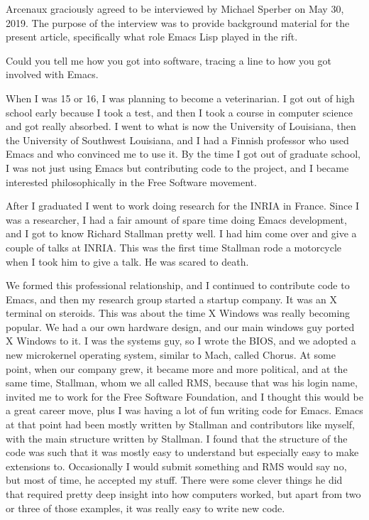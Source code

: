 \documentclass[format=acmsmall,screen]{acmart}
\begin{document}
Arcenaux graciously agreed to be interviewed by Michael Sperber on May 30,
2019.  The purpose of the interview was to provide background material for
the present article, specifically what role Emacs Lisp played in the rift.
%
\begin{question}
Could you tell me how you got into software, tracing a line to how
you got involved with Emacs.
\end{question}
%
When I was 15 or 16, I was planning to become a veterinarian.  I
got out of high school early because I took a test, and then I took a
course in computer science and got really absorbed.  I went to what is
now the University of Louisiana, then the University of Southwest
Louisiana, and I had a Finnish professor who used Emacs and who
convinced me to use it.  By the time I got out of graduate school, I
was not just using Emacs but contributing code to the project, and I
became interested philosophically in the Free Software movement.

After I graduated I went to work doing research for the INRIA in
France.  Since I was a researcher, I had a fair amount of spare time
doing Emacs development, and I got to know Richard Stallman pretty
well.  I had him come over and give a couple of talks at INRIA.  This
was the first time Stallman rode a motorcycle when I took him to give
a talk.  He was scared to death.

We formed this professional
relationship, and I continued to contribute code to Emacs, and then my
research group started a startup company.  It was an X terminal on
steroids.  This was about the time X Windows was really becoming
popular.  We had a our own hardware design, and our main windows guy
ported X Windows to it.  I was the systems guy, so I wrote the BIOS,
and we adopted a new microkernel operating system, similar to Mach, called
Chorus. At some point, when our company grew, it became more and more
political, and at the same time, Stallman, whom we all called RMS,
because that was his login name, invited me to work for the Free
Software Foundation, and I thought this would be a great career move,
plus I was having a lot of fun writing code for Emacs. Emacs at that
point had been mostly written by Stallman and contributors like
myself, with the main structure written by Stallman.  I found that the
structure of the code was such that it was mostly easy to understand
but especially easy to make extensions to.  Occasionally I would
submit something and RMS would say no, but most of time, he accepted
my stuff.  There were some clever things he did that required
pretty deep insight into how computers worked, but apart from two or
three of those examples, it was really easy to
write new code.
\end{document}
